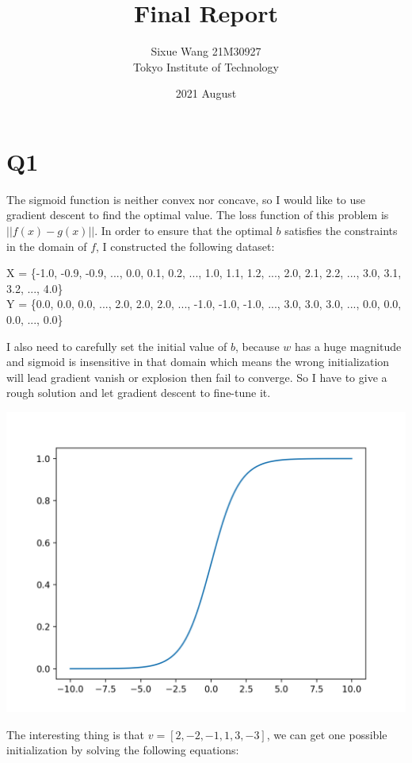 \documentclass{article}
\title{Final Report}
\date{2021 August}
\author{Sixue Wang 21M30927\\Tokyo Institute of Technology}
\begin{document}
\maketitle

\section*{Q1}
The sigmoid function is neither convex nor concave, so I would like to use gradient descent to find the optimal value. The loss function of this problem is $||f(x)-g(x)||$. In order to ensure that the optimal $b$ satisfies the constraints in the domain of $f$, I constructed the following dataset:
\begin{CMath}
  X = \{-1.0, -0.9, -0.9, ..., 0.0, 0.1, 0.2, ..., 1.0, 1.1, 1.2, ..., 2.0, 2.1, 2.2, ..., 3.0, 3.1, 3.2, ..., 4.0\} \\
  Y = \{0.0, 0.0, 0.0, ..., 2.0, 2.0, 2.0, ..., -1.0, -1.0, -1.0, ..., 3.0, 3.0, 3.0, ..., 0.0, 0.0, 0.0, ..., 0.0\}
\end{CMath}
I also need to carefully set the initial value of $b$, because $w$ has a huge magnitude and sigmoid is insensitive in that domain which means the wrong initialization will lead gradient vanish or explosion then fail to converge. So I have to give a rough solution and let gradient descent to fine-tune it.
\begin{center}
  \includegraphics[scale=0.3]{sigmoid}
\end{center}
The interesting thing is that $v = [2, -2, -1, 1, 3, -3]$, we can get one possible initialization by solving the following equations:
\end{document}
